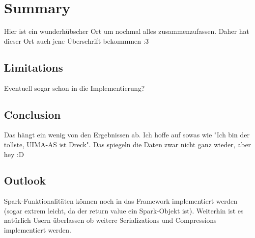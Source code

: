 \chapter{Summary}

Hier ist ein wunderhübscher Ort um nochmal alles zusammenzufassen. Daher hat dieser Ort auch jene Überschrift bekommmen :3

\section{Limitations}
Eventuell sogar schon in die Implementierung?

\section{Conclusion}

Das hängt ein wenig von den Ergebnissen ab. Ich hoffe auf sowas wie "Ich bin der tollste, UIMA-AS ist Dreck". Das spiegeln die Daten zwar nicht ganz wieder, aber hey :D

\section{Outlook}

Spark-Funktionalitäten können noch in das Framework implementiert werden (sogar extrem leicht, da der return value ein Spark-Objekt ist). Weiterhin ist es natürlich Usern überlassen ob weitere Serializations und Compressions implementiert werden.